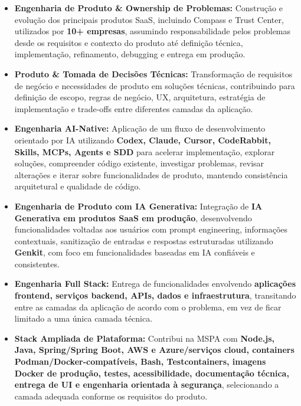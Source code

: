 \documentclass[10pt,a4paper]{article}
\begin{document}
\begin{itemize}

    \item
    \textbf{Engenharia de Produto \& Ownership de Problemas:}
    Construção e evolução dos principais produtos SaaS, incluindo
    Compass e Trust Center, utilizados por \textbf{10+ empresas},
    assumindo responsabilidade pelos problemas desde os requisitos
    e contexto do produto até definição técnica, implementação,
    refinamento, debugging e entrega em produção.

    \item
    \textbf{Produto \& Tomada de Decisões Técnicas:}
    Transformação de requisitos de negócio e necessidades de produto
    em soluções técnicas, contribuindo para definição de escopo,
    regras de negócio, UX, arquitetura, estratégia de implementação
    e trade-offs entre diferentes camadas da aplicação.

    \item
    \textbf{Engenharia AI-Native:}
    Aplicação de um fluxo de desenvolvimento orientado por IA utilizando
    \textbf{Codex, Claude, Cursor, CodeRabbit, Skills, MCPs,
    Agents e SDD} para acelerar implementação, explorar soluções,
    compreender código existente, investigar problemas, revisar
    alterações e iterar sobre funcionalidades de produto, mantendo
    consistência arquitetural e qualidade de código.

    \item
    \textbf{Engenharia de Produto com IA Generativa:}
    Integração de \textbf{IA Generativa em produtos SaaS em produção},
    desenvolvendo funcionalidades voltadas aos usuários com
    prompt engineering, informações contextuais, sanitização de
    entradas e respostas estruturadas utilizando \textbf{Genkit},
    com foco em funcionalidades baseadas em IA confiáveis e
    consistentes.

    \item
    \textbf{Engenharia Full Stack:}
    Entrega de funcionalidades envolvendo
    \textbf{aplicações frontend, serviços backend, APIs, dados e
    infraestrutura}, transitando entre as camadas da aplicação
    de acordo com o problema, em vez de ficar limitado a uma única
    camada técnica.

    \item
    \textbf{Stack Ampliada de Plataforma:}
    Contribui na MSPA com \textbf{Node.js, Java, Spring/Spring Boot,
    AWS e Azure/serviços cloud, containers Podman/Docker-compatíveis,
    Bash, Testcontainers, imagens Docker de produção, testes, acessibilidade,
    documentação técnica, entrega de UI e engenharia orientada à segurança},
    selecionando a camada adequada conforme os requisitos do produto.


\end{itemize}
\end{document}
